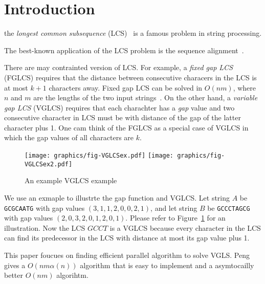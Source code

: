\section{Introduction} %
\label{sec:Introduction}

the {\em longest common subsequence} (LCS)~\cite{Hirschberg1975ALS} is
a famous problem in string processing.

The best-known application of the LCS problem is the sequence
alignment~\cite{mount2001bioinformatics, Ann2010EfficientAF}.


\iffalse 最長共同子序列 (\emph{longest common subsequence}, LCS) 廣泛
地使用在各個應用上。在多核心平台下，大多數的研究專注於如何高效率地在波
前平行 (wavefront parallelism)，而 Jiaoyun Yang ~\cite{jiaoyun} 提出的
論文中改變一般的 LCS 遞迴定義以得到更好快取使用率。在這篇論文中，針對
在 Iliopoulos 和 Rahman ~\cite{iliopoulos} 提及的約束條件下的 LCS 問題
使用相關的想法來改善效能。\fi

There are may contrainted version of LCS.  For example, a {\em fixed
  gap LCS} (FGLCS) requires that the distance between consecutive
characers in the LCS is at most $k + 1$ characters away.  Fixed gap
LCS can be solved in $O(nm)$, where $n$ and $m$ are the lengths of the
two input strings~\cite{citation}.  On the other hand, a {\em variable
  gap LCS} (VGLCS) requires that each charachter has a {\em gap} value
and two consecutive character in LCS must be with distance of the gap
of the latter character plus 1.  One cam think of the FGLCS as a
special case of VGLCS in which the gap values of all characters are
$k$.

\begin{figure}[!thb]
  \centering
  \texttt{[image: graphics/fig-VGLCSex.pdf]}
  \texttt{[image: graphics/fig-VGLCSex2.pdf]}
  \caption{An example VGLCS example}    \label{fig:VGLCSex}
\end{figure}

We use an exmaple to illustrte the gap function and VGLCS.  Let string
$A$ be {\tt GCGCAATG} with gap values $(3, 1, 1, 2, 0, 0, 2, 1)$, and
let string $B$ be {\tt GCCCTAGCG} with gap values $(2, 0, 3, 2, 0, 1,
2, 0, 1)$.  Please refer to Figure~\ref{fig:VGLCSex} for an
illustration.  Now the LCS $GCCT$ is a VGLCS because every character
in the LCS can find its predecessor in the LCS with distance at most
its gap value plus 1.

This paper foucues on finding efficient parallel algorithm to solve
VGLS.  Peng~\cite{yunghsing,Yang2010AnEP} gives a $O(nm \alpha(n))$
algorithm that is easy to implement and a asymtocailly better $O(nm)$
algorihtm.  %


